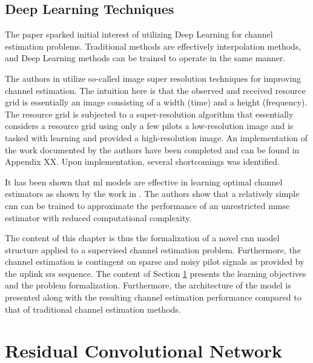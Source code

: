 \subsection{Deep Learning Techniques}
The paper \cite{SoltaniDeepEstimation} sparked initial interest of utilizing Deep Learning for channel estimation problems. Traditional methods are effectively interpolation methods, and Deep Learning methods can be trained to operate in the same manner. 

The authors in \cite{SoltaniDeepEstimation} utilize so-called image super resolution techniques for improving channel estimation. The intuition here is that the observed and received resource grid is essentially an image consisting of a width (time) and a height (frequency). The resource grid is subjected to a super-resolution algorithm that essentially considers a resource grid using only a few pilots a low-resolution image and is tasked with learning and provided a high-resolution image. An implementation of the work documented by the authors have been completed and can be found in Appendix XX. Upon implementation, several shortcomings was identified. 

It has been shown that \gls{ml} models are effective in learning optimal channel estimators as shown by the work in \cite{Neumann2018LearningEstimator}. The authors show that a relatively simple \gls{cnn} can be trained to approximate the performance of an unrestricted \gls{mmse} estimator with reduced computational complexity.  

The content of this chapter is thus the formalization of a novel \gls{cnn} model structure applied to a supervised channel estimation problem. Furthermore, the channel estimation is contingent on sparse and noisy pilot signals as provided by the uplink \gls{srs} sequence. The content of Section \ref{sec:cnn_channel_estimator} presents the learning objectives and the problem formalization.  Furthermore, the architecture of the model is presented along with the resulting channel estimation performance compared to that of traditional channel estimation methods.


\section{Residual Convolutional Network}\label{sec:cnn_channel_estimator}

